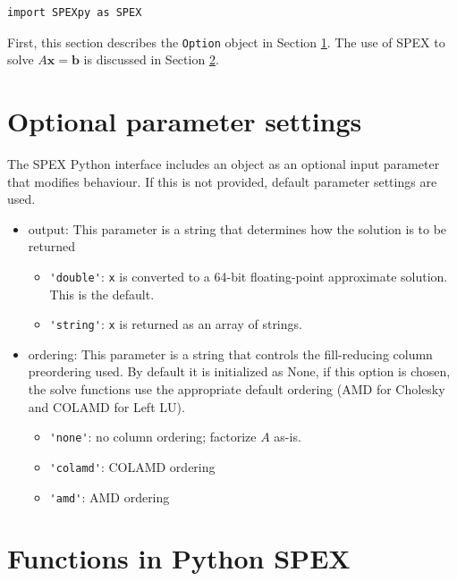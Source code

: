 \documentclass[12pt,oneside]{book}
\theoremstyle{definition}
\renewcommand{\b}{\mathbf{b}}
\newcommand{\x}{\mathbf{x}}
\begin{document}
\begin{verbatim}
import SPEXpy as SPEX
\end{verbatim}


First, this section describes the \verb|Option| object in Section \ref{s:Python:option}. The use of SPEX to solve $A\x=\b$ is discussed in Section \ref{s:Python:Funcs}.


\section{Optional parameter settings}\label{s:Python:option}
The SPEX Python interface includes an object as an optional input parameter that modifies behaviour. If this is not provided, default parameter settings are used.
\begin{itemize}
    \item output: This parameter is a string that determines how the solution is to be returned
    \begin{itemize}
        \item \verb|'double'|:  \verb|x| is converted to a 64-bit
            floating-point approximate solution.  This is the default.
        \item \verb|'string'|:  \verb|x| is returned as an array of strings.
    \end{itemize}
    \item ordering: This parameter is a string that controls the fill-reducing column preordering used. By default it is initialized as None, if this option is chosen, the solve functions use the appropriate default ordering (AMD for Cholesky and COLAMD for Left LU).
        \begin{itemize}
            \item \verb|'none'|: no column ordering; factorize $A$ as-is.
            \item \verb|'colamd'|: COLAMD ordering 
            \item \verb|'amd'|: AMD ordering 
        \end{itemize}
\end{itemize}


\section{Functions in Python SPEX}\label{s:Python:Funcs}
\end{document}
